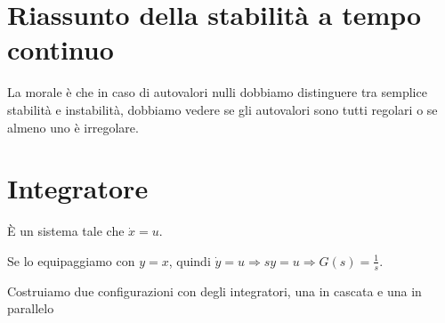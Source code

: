 \documentclass[10pt,a4paper]{book}
\begin{document}
\section{Riassunto della stabilità a tempo continuo}


La morale è che in caso di autovalori nulli dobbiamo distinguere tra semplice stabilità e instabilità, dobbiamo vedere se gli autovalori sono tutti regolari o se almeno uno è irregolare.
\section{Integratore}

È un sistema tale che $\dot{x} =u$.

Se lo equipaggiamo con $y=x$, quindi $\dot{y} =u\Rightarrow sy=u\Rightarrow \boxed{G\left(s\right) =\frac{1}{s}}$.

Costruiamo due configurazioni con degli integratori, una in cascata e una in parallelo
\end{document}
